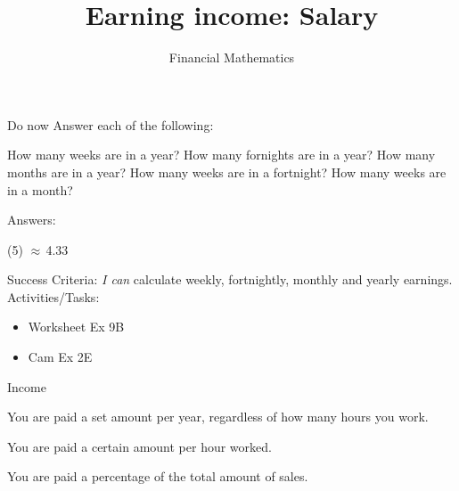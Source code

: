 \documentclass[aspectratio=1610,10pt]{beamer}
\title{Earning income: Salary}
\subtitle{Financial Mathematics}
\date{%
}
\begin{document}
\begin{frame}{Do now}
  Answer each of the following:
  \begin{tasks}
    \task How many weeks are in a year?
    \task How many fornights are in a year?
    \task How many months are in a year?
    \task How many weeks are in a fortnight?
    \task How many weeks are in a month?
  \end{tasks}\pause
  Answers:
  \begin{tasks}(5)
    \task {}
    \task {}
    \task {}
    \task {}
    \task \pause$\approx\,$4.33
  \end{tasks}
\end{frame}

\frame{\titlepage}

\begin{frame}
  \begin{outcome}
    Success Criteria:\newline
    \textit{I can} calculate weekly, fortnightly, monthly and yearly earnings.\newline
    Activities/Tasks:
    \begin{itemize}
      \item Worksheet Ex 9B
      \item Cam Ex 2E
    \end{itemize}
  \end{outcome}
\end{frame}

\begin{frame}{Income}
  \begin{definition}[Salary]
    You are paid a set amount per year, regardless of how many hours you work.
  \end{definition}\pause
  \begin{definition}
    You are paid a certain amount per hour worked.​
  \end{definition}\pause
  \begin{definition}[Comission]
    You are paid a percentage of the total amount of sales.​
  \end{definition}
\end{frame}
\end{document}
